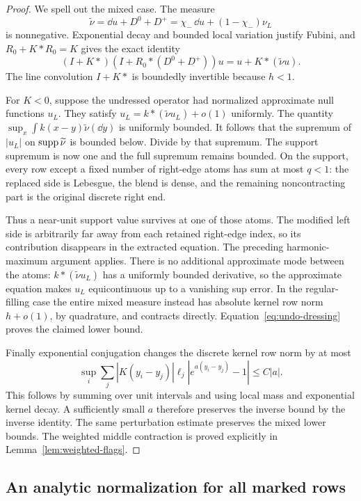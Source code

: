 \begin{proof}
We spell out the mixed case.  The measure
\[
 \widetilde\nu=\dd u+D^0+D^+
       =\chi_-\,\dd u+(1-\chi_-)\nu_L
\]
is nonnegative.  Exponential decay and bounded local variation
justify Fubini, and $R_0+K*R_0=K$ gives the exact identity
\begin{equation}\label{eq:undo-dressing}
 (I+K*)(I+R_0*(D^0+D^+))u
       =u+K*(\widetilde\nu u).
\end{equation}
The line convolution $I+K*$ is boundedly invertible because
$h<1$.

For $K<0$, suppose the undressed operator had normalized
approximate null functions $u_L$.  They satisfy
$u_L=k*(\widetilde\nu u_L)+o(1)$ uniformly.
The quantity
$\sup_x\int k(x-y)\widetilde\nu(\dd y)$ is uniformly bounded.
It follows that the supremum of $|u_L|$ on
$\operatorname{supp}\widetilde\nu$ is bounded below.  Divide by that supremum.
The support supremum is now one and the full supremum remains
bounded.  On the support, every row except a fixed number of
right-edge atoms has sum at most $q<1$: the replaced side is
Lebesgue, the blend is dense, and the remaining noncontracting
part is the original discrete right end.

Thus a near-unit support value survives at one of those atoms.
The modified left side is arbitrarily far away from each retained
right-edge index, so its contribution disappears in the extracted
equation.  The preceding harmonic-maximum argument applies.
There is no additional approximate mode between the atoms:
$k*(\widetilde\nu u_L)$ has a uniformly bounded derivative,
so the approximate equation makes $u_L$ equicontinuous up to a
vanishing sup error.  In the regular-filling case the entire
mixed measure instead has absolute kernel row norm $h+o(1)$,
by quadrature, and contracts directly.
Equation~\eqref{eq:undo-dressing} proves the claimed lower bound.

Finally exponential conjugation changes the discrete kernel row
norm by at most
\[
 \sup_i\sum_j |K(y_i-y_j)|\ell_j
             |e^{a(y_i-y_j)}-1|\le C|a|.
 \]
This follows by summing over unit intervals and using local mass
and exponential kernel decay.  A sufficiently small $a$ therefore
preserves the inverse bound by the inverse identity.
The same perturbation estimate preserves the mixed lower bounds.
The weighted middle contraction is proved explicitly in
Lemma~\ref{lem:weighted-flags}.
\end{proof}

\subsection{An analytic normalization for all marked rows}

